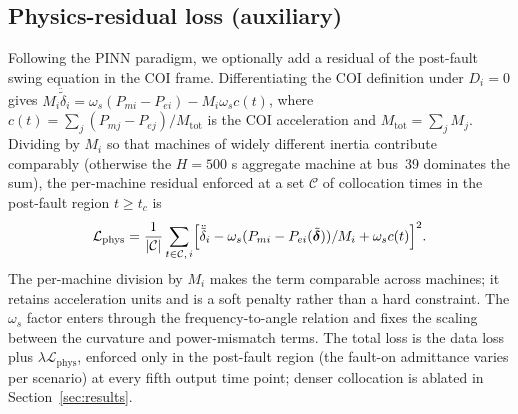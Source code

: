 \documentclass[5p,times]{elsarticle}
\begin{document}
\subsection{Physics-residual loss (auxiliary)}
Following the PINN paradigm, we optionally add a residual of the post-fault swing equation in the
COI frame. Differentiating the COI definition under $D_i=0$ gives
$M_i \ddot{\tilde\delta}_i = \omega_s(P_{mi}-P_{ei}) - M_i\omega_s c(t)$, where
$c(t)=\sum_j(P_{mj}-P_{ej})/M_{\mathrm{tot}}$ is the COI acceleration and
$M_{\mathrm{tot}}=\sum_j M_j$. Dividing by $M_i$ so that machines of widely different inertia
contribute comparably (otherwise the $H{=}500$ s aggregate machine at bus~39 dominates the sum),
the per-machine residual enforced at a set $\mathcal{C}$ of collocation times in the post-fault
region $t\ge t_c$ is
\begin{equation}
\mathcal{L}_{\mathrm{phys}} = \frac{1}{|\mathcal{C}|}\sum_{t\in\mathcal{C},\,i}
\Bigl[ \ddot{\tilde\delta}_i - \omega_s(P_{mi}-P_{ei}(\tilde{\bm{\delta}}))/M_i + \omega_s c(t) \Bigr]^2 .
\label{eq:physloss}
\end{equation}
The per-machine division by $M_i$ makes the term comparable across machines; it retains
acceleration units and is a soft penalty rather than a hard constraint. The $\omega_s$ factor
enters through the frequency-to-angle relation and fixes the scaling between the curvature and
power-mismatch terms. The total loss is the data loss plus $\lambda\mathcal{L}_{\mathrm{phys}}$,
enforced only in the post-fault region (the fault-on admittance varies per scenario) at every
fifth output time point; denser collocation is ablated in Section~\ref{sec:results}.
\end{document}
